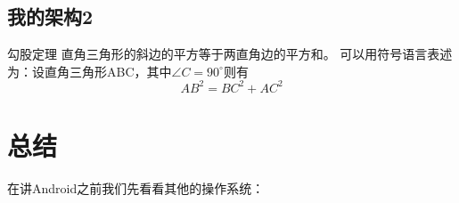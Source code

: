 \documentclass{beamer}
\begin{document}
\subsection{我的架构2}
\begin{frame}  
\begin{block}{勾股定理}  
直角三角形的斜边的平方等于两直角边的平方和。  
可以用符号语言表述为：设直角三角形ABC，其中$\angle C=90^\circ$则有  
\begin{equation}  
AB^2=BC^2+AC^2  
\end{equation}  
\end{block}  
\end{frame}  
  
\section{总结}
\begin{frame}  
  在讲Android之前我们先看看其他的操作系统：  
\end{frame}  
\end{document}
